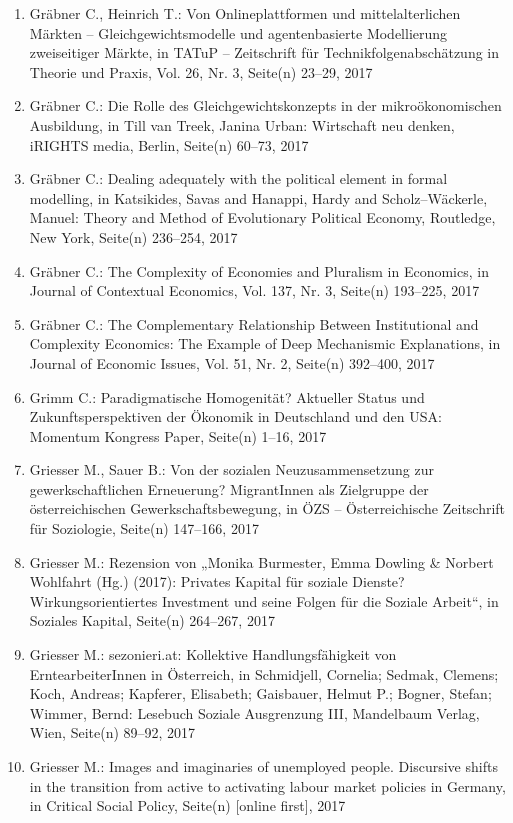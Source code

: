 \begin{enumerate}
	 \item Gräbner C., Heinrich T.: Von Onlineplattformen und mittelalterlichen Märkten -- Gleichgewichtsmodelle und agentenbasierte Modellierung zweiseitiger Märkte, in TATuP -- Zeitschrift für Technikfolgenabschätzung in Theorie und Praxis, Vol. 26, Nr. 3, Seite(n) 23--29, 2017
	 \item Gräbner C.: Die Rolle des Gleichgewichtskonzepts in der mikroökonomischen Ausbildung, in Till van Treek, Janina Urban: Wirtschaft neu denken, iRIGHTS media, Berlin, Seite(n) 60--73, 2017
	 \item Gräbner C.: Dealing adequately with the political element in formal modelling, in Katsikides, Savas and Hanappi, Hardy and Scholz--Wäckerle, Manuel: Theory and Method of Evolutionary Political Economy, Routledge, New York, Seite(n) 236--254, 2017
	 \item Gräbner C.: The Complexity of Economies and Pluralism in Economics, in Journal of Contextual Economics, Vol. 137, Nr. 3, Seite(n) 193--225, 2017
	 \item Gräbner C.: The Complementary Relationship Between Institutional and Complexity Economics: The Example of Deep Mechanismic Explanations, in Journal of Economic Issues, Vol. 51, Nr. 2, Seite(n) 392--400, 2017
	 \item Grimm C.: Paradigmatische Homogenität? Aktueller Status und Zukunftsperspektiven der Ökonomik in Deutschland und den USA: Momentum Kongress Paper, Seite(n) 1--16, 2017
	 \item Griesser M., Sauer B.: Von der sozialen Neuzusammensetzung zur gewerkschaftlichen Erneuerung? MigrantInnen als Zielgruppe der österreichischen Gewerkschaftsbewegung, in ÖZS -- Österreichische Zeitschrift für Soziologie, Seite(n) 147--166, 2017
	 \item Griesser M.: Rezension von „Monika Burmester, Emma Dowling \& Norbert Wohlfahrt (Hg.) (2017): Privates Kapital für soziale Dienste? Wirkungsorientiertes Investment und seine Folgen für die Soziale Arbeit“, in Soziales Kapital, Seite(n) 264--267, 2017
	 \item Griesser M.: sezonieri.at: Kollektive Handlungsfähigkeit von ErntearbeiterInnen in Österreich, in Schmidjell, Cornelia; Sedmak, Clemens; Koch, Andreas; Kapferer, Elisabeth; Gaisbauer, Helmut P.; Bogner, Stefan; Wimmer, Bernd: Lesebuch Soziale Ausgrenzung III, Mandelbaum Verlag, Wien, Seite(n) 89--92, 2017
	 \item Griesser M.: Images and imaginaries of unemployed people. Discursive shifts in the transition from active to activating labour market policies in Germany, in Critical Social Policy, Seite(n) [online first], 2017

\end{enumerate}
